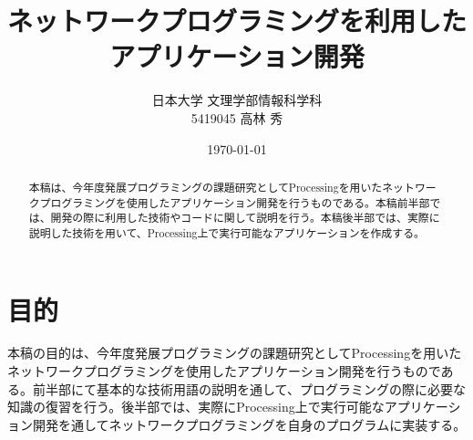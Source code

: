 \documentclass[dvipdfmx]{jsarticle}
\title{ネットワークプログラミングを利用したアプリケーション開発}
\date{\today}
\author{日本大学 文理学部情報科学科\\5419045 高林 秀}
\begin{document}
\maketitle

\begin{abstract}
本稿は、今年度発展プログラミングの課題研究としてProcessingを用いたネットワークプログラミングを使用したアプリケーション開発を行うものである。本稿前半部では、開発の際に利用した技術やコードに関して説明を行う。本稿後半部では、実際に説明した技術を用いて、Processing上で実行可能なアプリケーションを作成する。
\end{abstract}

\tableofcontents

\section{目的}
本稿の目的は、今年度発展プログラミングの課題研究としてProcessingを用いたネットワークプログラミングを使用したアプリケーション開発を行うものである。前半部にて基本的な技術用語の説明を通して、プログラミングの際に必要な知識の復習を行う。後半部では、実際にProcessing上で実行可能なアプリケーション開発を通してネットワークプログラミングを自身のプログラムに実装する。
\end{document}
